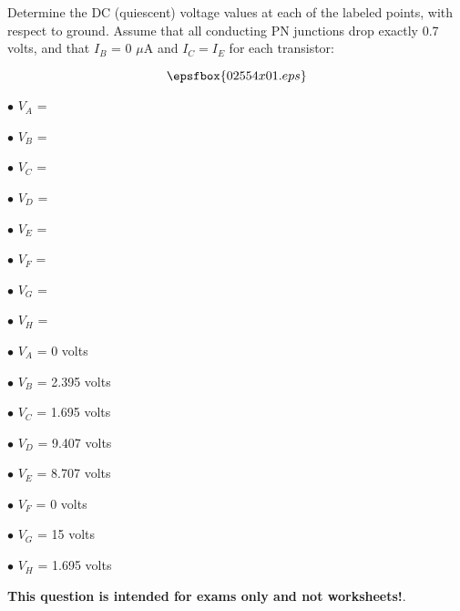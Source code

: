 

Determine the DC (quiescent) voltage values at each of the labeled points, with respect to ground.  Assume that all conducting PN junctions drop exactly 0.7 volts, and that $I_B$ = 0 $\mu$A and $I_C = I_E$ for each transistor:

$$\epsfbox{02554x01.eps}$$

\medskip
\item{$\bullet$} $V_A$ = 
\item{$\bullet$} $V_B$ = 
\item{$\bullet$} $V_C$ = 
\item{$\bullet$} $V_D$ = 
\item{$\bullet$} $V_E$ = 
\item{$\bullet$} $V_F$ = 
\item{$\bullet$} $V_G$ = 
\item{$\bullet$} $V_H$ = 
\medskip







\medskip
\item{$\bullet$} $V_A$ = 0 volts
\item{$\bullet$} $V_B$ = 2.395 volts
\item{$\bullet$} $V_C$ = 1.695 volts
\item{$\bullet$} $V_D$ = 9.407 volts
\item{$\bullet$} $V_E$ = 8.707 volts
\item{$\bullet$} $V_F$ = 0 volts
\item{$\bullet$} $V_G$ = 15 volts
\item{$\bullet$} $V_H$ = 1.695 volts
\medskip







{\bf This question is intended for exams only and not worksheets!}.




